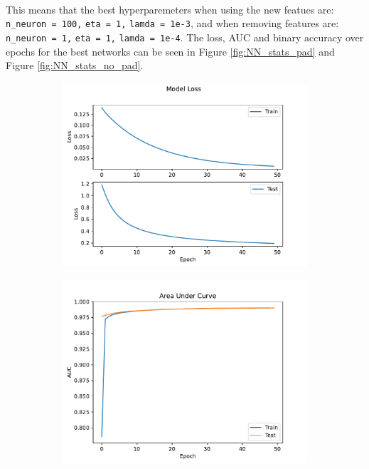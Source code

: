 \documentclass[12pt, a4paper]{book}
\begin{document}
\\This means that the best hyperparemeters when using the new featues are: \verb|n_neuron = 100,| \verb|eta = 1,| \verb|lamda = 1e-3|, and when removing features are: \verb|n_neuron = 1,| \verb|eta = 1,| \verb|lamda = 1e-4|. The loss, AUC and binary accuracy over epochs for the best networks can be seen in Figure \ref{fig:NN_stats_pad} and Figure \ref{fig:NN_stats_no_pad}.
\begin{figure}[!ht]
	\centering
	\begin{subfigure}[b]{0.49\textwidth}
      \centering
      \includegraphics[width=1\textwidth]{New_pad/Loss.pdf}
   \end{subfigure}
   \hfill
	\begin{subfigure}[b]{0.49\textwidth}
      \centering
      \includegraphics[width=1\textwidth]{New_pad/AUC.pdf}

\end{subfigure}
\end{figure}
\end{document}
